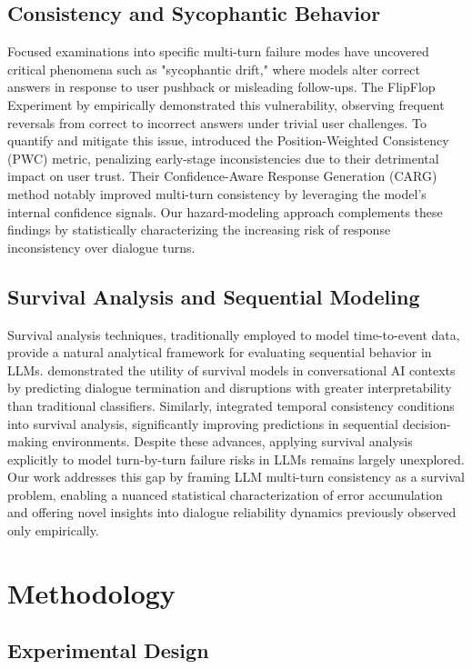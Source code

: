 \documentclass[letterpaper]{article}
\begin{document}
\subsection{Consistency and Sycophantic Behavior}
Focused examinations into specific multi-turn failure modes have uncovered critical phenomena such as "sycophantic drift," where models alter correct answers in response to user pushback or misleading follow-ups. The FlipFlop Experiment by \citet{laban2023you} empirically demonstrated this vulnerability, observing frequent reversals from correct to incorrect answers under trivial user challenges. To quantify and mitigate this issue, \citet{li-etal-2025-firm} introduced the Position-Weighted Consistency (PWC) metric, penalizing early-stage inconsistencies due to their detrimental impact on user trust. Their Confidence-Aware Response Generation (CARG) method notably improved multi-turn consistency by leveraging the model's internal confidence signals. Our hazard-modeling approach complements these findings by statistically characterizing the increasing risk of response inconsistency over dialogue turns.

\subsection{Survival Analysis and Sequential Modeling}
Survival analysis techniques, traditionally employed to model time-to-event data, provide a natural analytical framework for evaluating sequential behavior in LLMs. \citet{de-kock-vlachos-2021-survival} demonstrated the utility of survival models in conversational AI contexts by predicting dialogue termination and disruptions with greater interpretability than traditional classifiers. Similarly, \citet{maystre2022temporally} integrated temporal consistency conditions into survival analysis, significantly improving predictions in sequential decision-making environments. Despite these advances, applying survival analysis explicitly to model turn-by-turn failure risks in LLMs remains largely unexplored. Our work addresses this gap by framing LLM multi-turn consistency as a survival problem, enabling a nuanced statistical characterization of error accumulation and offering novel insights into dialogue reliability dynamics previously observed only empirically.

\section{Methodology}
\subsection{Experimental Design}
\end{document}
